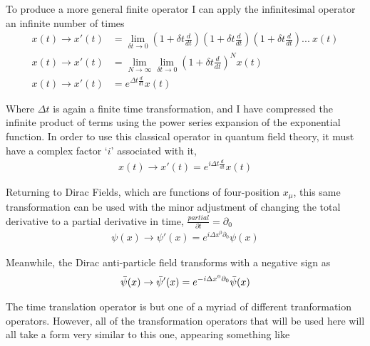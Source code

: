     To produce a more general finite operator I can apply the infinitesimal operator an infinite number of times
    \begin{equation} \begin{split}
    x(t) \rightarrow x'(t) &= \lim_{\delta t \to 0} \left(1+\delta t \frac{d}{dt}\right)\left(1+\delta t \frac{d}{dt}\right)\left(1+\delta t \frac{d}{dt}\right)...\ x(t)
    \\x(t) \rightarrow x'(t) &= \lim_{N \to \infty} \lim_{\delta t \to 0} \left(1+\delta t \frac{d}{dt}\right)^N x(t)
    \\x(t) \rightarrow x'(t) &= e^{\Delta t \frac{d}{dt}} x(t)
    \end{split} \end{equation}

    Where $\Delta t$ is again a finite time transformation,
        and I have compressed the infinite product of terms using the power series expansion of the exponential function.
    In order to use this classical operator in quantum field theory, it must have a complex factor `$i$' associated with it,
    \begin{equation} \begin{split}
    x(t) \rightarrow x'(t) = e^{i\Delta t \frac{d}{dt}} x(t)
    \end{split} \end{equation}

    Returning to Dirac Fields, which are functions of four-position $x_\mu$, this same transformation can be used
         with the minor adjustment of changing the total derivative to a partial derivative in time, $\frac{partial}{\partial t} = \partial_0$
    \begin{equation} \begin{split}
    \psi(x) \rightarrow \psi'(x) = e^{i\Delta x^0 \partial_0} \psi(x)
    \end{split} \end{equation}

    Meanwhile, the Dirac anti-particle field transforms with a negative sign as
    \begin{equation} \begin{split}
        \bar{\psi}(x) \rightarrow \bar{\psi}'(x) = e^{-i\Delta x^0 \partial_0} \bar{\psi}(x)
    \end{split} \end{equation}
    
    The time translation operator is but one of a myriad of different tranformation operators.
    However, all of the transformation operators that will be used here will all take a form very similar to this one,
        appearing something like

